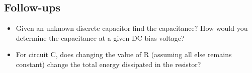 \documentclass[main.tex]{subfiles}
\begin{document}






\subsection{Follow-ups}
\begin{itemize}
    \item Given an unknown discrete capacitor find the capacitance? How would you determine the capacitance at a given DC bias voltage? %
    \item For circuit C, does changing the value of R (assuming all else remains constant) change the total energy dissipated in the resistor? %
\end{itemize}
\end{document}
